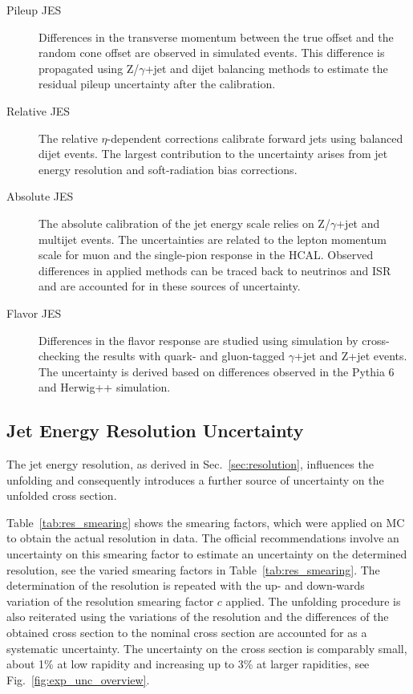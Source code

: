 \begin{description}
    \item[Pileup JES] Differences in the transverse momentum between the true
        offset and the random cone offset are observed in simulated events. This
        difference is propagated using Z/$\gamma$+jet and dijet balancing
        methods to estimate the residual pileup uncertainty after the
        calibration.
    \item[Relative JES] The relative $\eta$-dependent corrections calibrate
        forward jets using balanced dijet events. The largest contribution to
        the uncertainty arises from jet energy resolution and soft-radiation
        bias corrections. 
    \item[Absolute JES]  The absolute calibration of the jet energy scale relies
        on Z/$\gamma$+jet and multijet events. The uncertainties are related to
        the lepton momentum scale for muon and the single-pion response in the
        HCAL. Observed differences in applied methods can be traced back to neutrinos
        and ISR and are accounted for in these sources of uncertainty.
    \item[Flavor JES] Differences in the flavor response are studied using
        simulation by cross-checking the results with quark- and gluon-tagged
        $\gamma$+jet and Z+jet events. The uncertainty is derived based on
        differences observed in the Pythia 6 and Herwig++ simulation.
\end{description}

\subsection{Jet Energy Resolution Uncertainty}

The jet energy resolution, as derived in Sec.~\ref{sec:resolution}, influences
the unfolding and consequently introduces a further source of uncertainty on the
unfolded cross section. 

Table~\ref{tab:res_smearing} shows the smearing factors, which were applied on
MC to obtain the actual resolution in data. The official recommendations involve
an uncertainty on this smearing factor to estimate an uncertainty on the
determined resolution, see the varied smearing factors in
Table~\ref{tab:res_smearing}. The determination of the resolution is repeated
with the up- and down-wards variation of the resolution smearing factor $c$
applied. The unfolding procedure is also reiterated using the variations of the
resolution and the differences of the obtained cross section to the nominal
cross section are accounted for as a systematic uncertainty. The uncertainty on
the cross section is comparably small, about 1\% at low rapidity and increasing
up to 3\% at larger rapidities, see Fig.~\ref{fig:exp_unc_overview}.

